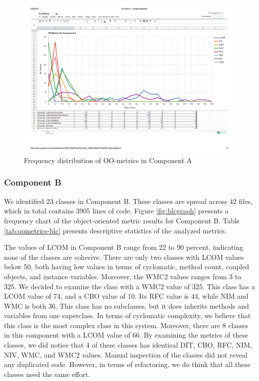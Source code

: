\begin{landscape}
\setlength\LTleft{-.5in}
	\begin{figure}
	\centering
	\includegraphics[width=\textwidth]{images/al.pdf}
	\caption{Frequency distribution of OO-metrics in Component A}
	\label{fig:algraph}
	\end{figure}
\end{landscape}





\subsubsection{Component B}
We identified 23 classes in Component B. These classes are spread across 42 files, which in total contains 3905 lines of code. Figure \ref{fig:blcgraph} presents a frequency chart of the object-oriented metric results for Component B. Table \ref{tab:oometrics-blc} presents descriptive statistics of the analyzed metrics.

The values of LCOM in Component B range from 22 to 90 percent, indicating none of the classes are cohesive. There are only two classes with LCOM values below 50, both having low values in terms of cyclomatic, method count, coupled objects, and instance variables. Moreover, the WMC2 values ranges from 3 to 325. We decided to examine the class with a WMC2 value of 325. This class has a LCOM value of 74, and a CBO value of 10. Its RFC value is 44, while NIM and WMC is both 36. This class has no subclasses, but it does inherits methods and variables from one superclass. In terms of cyclomatic complexity, we believe that this class is the most complex class in this system. Moreover, there are 8 classes in this component with a LCOM value of 66. By examining the metrics of these classes, we did notice that 4 of these classes has identical DIT, CBO, RFC, NIM, NIV, WMC, and WMC2 values. Manual inspection of the classes did not reveal any duplicated code. However, in terms of refactoring, we do think that all these classes need the same effort.

